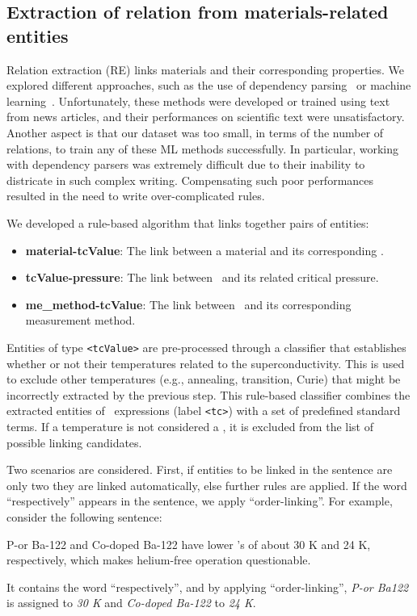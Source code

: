 \subsection{Extraction of relation from materials-related entities}
\label{subsec:re-solution}
\label{subsubsec:linking}

Relation extraction (RE) links materials and their corresponding properties. 
We explored different approaches, such as the use of dependency parsing~\cite{yoshikawa:2017acl, Tiktinsky2020pyBARTES, swayamdipta:17, zhou-zhao-2019-head} or machine learning~\cite{lin2016neural,hariharan2019relation}. 
Unfortunately, these methods were developed or trained using text from news articles, and their performances on scientific text were unsatisfactory. 
Another aspect is that our dataset was too small, in terms of the number of relations, to train any of these ML methods successfully. 
In particular, working with dependency parsers was extremely difficult due to their inability to districate in such complex writing. 
Compensating such poor performances resulted in the need to write over-complicated rules. 

We developed a rule-based algorithm that links together pairs of entities:
\begin{itemize}
    \item \textbf{material-tcValue}: The link between a material and its corresponding \tc.
    \item \textbf{tcValue-pressure}: The link between \tc~and its related critical pressure.
    \item \textbf{me\_method-tcValue}: The link between \tc~and its corresponding measurement method.
\end{itemize}

Entities of type \texttt{<tcValue>} are pre-processed through a classifier that establishes whether or not their temperatures related to the superconductivity. This is used to exclude other temperatures (e.g., annealing, transition, Curie) that might be incorrectly extracted by the previous step.
This rule-based classifier combines the extracted entities of \tc~expressions (label \texttt{<tc>}) with a set of predefined standard terms.
If a temperature is not considered a \tc, it is excluded from the list of possible linking candidates.

Two scenarios are considered. First, if entities to be linked in the sentence are only two they are linked automatically, else further rules are applied. 
If the word ``respectively'' appears in the sentence, we apply ``order-linking''. 
For example, consider the following sentence:
\begin{displayquote}
    P-or Ba-122  and Co-doped Ba-122 have lower \tc's of about 30 K and 24 K, respectively, which makes helium-free operation questionable.
\end{displayquote}
It contains the word ``respectively'', and by applying ``order-linking'', \textit{P-or Ba122} is assigned to \textit{30 K} and \textit{Co-doped Ba-122} to \textit{24 K}.


